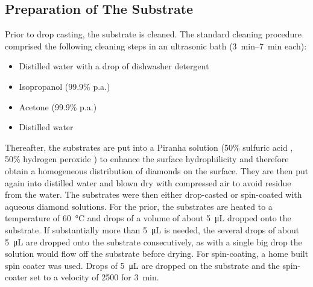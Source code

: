 	\subsection{Preparation of The Substrate}

	Prior to drop casting, the substrate is cleaned.
	The standard cleaning procedure comprised the following cleaning steps in an ultrasonic bath (\SIrange{3}{7}{\minute} each):
	\begin{itemize}
		\item Distilled water with a drop of dishwasher detergent
		\item Isopropanol (99.9\% p.a.)
		\item Acetone (99.9\% p.a.)
		\item Distilled water
	\end{itemize}
	Thereafter, the substrates are put into a Piranha solution (50\% sulfuric acid , 50\% hydrogen peroxide ) to enhance the surface hydrophilicity and therefore obtain a homogeneous distribution of diamonds on the surface.
	They are then put again into distilled water and blown dry with compressed air to avoid residue from the water.
	The substrates were then either drop-casted or spin-coated with aqueous diamond solutions.
	For the prior, the substrates are heated to a temperature of \SI{60}{\celsius} and drops of a volume of about \SI{5}{\micro\liter} dropped onto the substrate.
	If substantially more than \SI{5}{\micro\liter} is needed, the several drops of about \SI{5}{\micro\liter} are dropped onto the substrate consecutively, as with a single big drop the solution would flow off the substrate before drying.
	For spin-coating, a home built spin coater was used.
	Drops of \SI{5}{\micro\liter} are dropped on the substrate and the spin-coater set to a velocity of \SI{2500}{\rpm} for \SI{3}{\minute}.